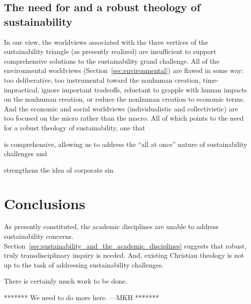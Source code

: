 \documentclass[12pt]{article}
\begin{document}
\subsection{The need for and a robust theology of sustainability}
\label{sec:needs}

In our view,
the worldviews associated with the three vertices of the sustainability triangle
(as presently realized) 
are insufficient to support comprehensive solutions to the sustainability grand challenge.
All of the environmental worldviews (Section~\ref{sec:environmental})
are flawed in some way:
too deliberative, too instrumental toward the nonhuman creation,
time-impractical, 
ignore important tradeoffs, 
reluctant to grapple with human impacts on the nonhuman creation, or
reduce the nonhuman creation to economic terms.
And the economic and social worldviews (individualistic and collectivistic) 
are too focused on the micro rather than the macro.
All of which points to the need for a robust theology of sustainability, 
one that 
%
\begin{enumerate*}[label={(\alph*)}]

  \item is comprehensive, allowing us to address the ``all at once'' nature of sustainability challenges and

  \item strengthens the idea of corporate sin.
  
\end{enumerate*}


\section{Conclusions}
\label{sec:conclusions}

As presently constituted, the academic disciplines are unable to address sustainability concerns. 
Section~\ref{sec:sustainability_and_the_academic_disciplines} suggests that 
robust, truly transdisciplinary inquiry is needed.
And, existing Christian theology is not up to the task of addressing sustainability challenges.

There is certainly much work to be done.

******* We need to do more here. ---MKH *******


\end{document}
